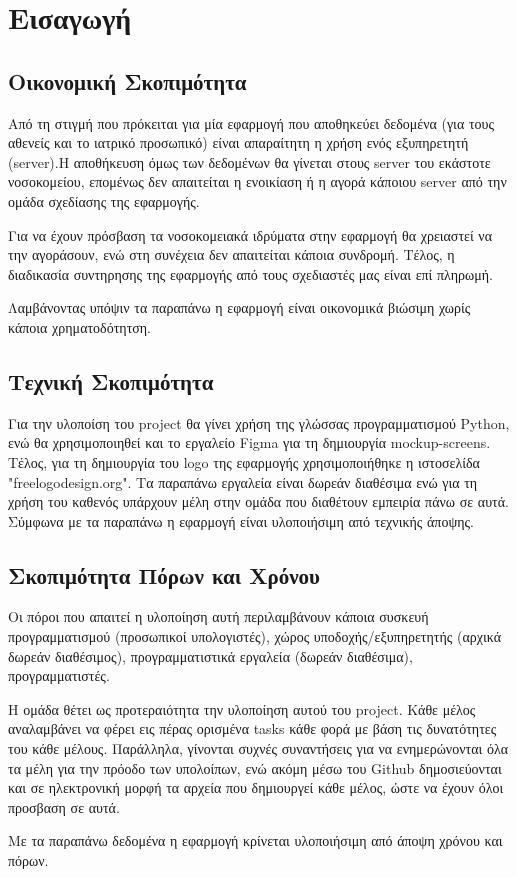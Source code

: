 \documentclass{article}
\begin{document}
{
  \hypersetup{linkcolor=black}
  \tableofcontents
}

\section{Εισαγωγή}

\subsection{Οικονομική Σκοπιμότητα}

Από τη στιγμή που πρόκειται για μία εφαρμογή που αποθηκεύει δεδομένα (για τους αθενείς και το ιατρικό προσωπικό) είναι απαραίτητη η χρήση ενός εξυπηρετητή (server).Η αποθήκευση όμως των δεδομένων θα γίνεται στους server του εκάστοτε νοσοκομείου, επομένως δεν απαιτείται η ενοικίαση ή η αγορά κάποιου server από την ομάδα σχεδίασης της εφαρμογής. \newline \par
Για να έχουν πρόσβαση τα νοσοκομειακά ιδρύματα στην εφαρμογή θα χρειαστεί να την αγοράσουν, ενώ στη συνέχεια δεν απαιτείται κάποια συνδρομή. Τέλος, η διαδικασία συντηρησης της εφαρμογής από τους σχεδιαστές μας είναι επί πληρωμή. \newline \par
Λαμβάνοντας υπόψιν τα παραπάνω η εφαρμογή είναι οικονομικά βιώσιμη χωρίς κάποια χρηματοδότητση.

\subsection{Τεχνική Σκοπιμότητα}

Για την υλοποίση του project θα γίνει χρήση της γλώσσας προγραμματισμού Python, ενώ θα χρησιμοποιηθεί και το εργαλείο Figma για τη δημιουργία mockup-screens. Τέλος, για τη δημιουργία του logo της εφαρμογής χρησιμοποιήθηκε η ιστοσελίδα "freelogodesign.org". Τα παραπάνω εργαλεία είναι δωρεάν διαθέσιμα ενώ για τη χρήση του καθενός υπάρχουν μέλη στην ομάδα που διαθέτουν εμπειρία πάνω σε αυτά. Σύμφωνα με τα παραπάνω η εφαρμογή είναι υλοποιήσιμη από τεχνικής άποψης.

\subsection{Σκοπιμότητα Πόρων και Χρόνου}

Οι πόροι που απαιτεί η υλοποίηση αυτή περιλαμβάνουν κάποια συσκευή προγραμματισμού (προσωπικοί υπολογιστές), χώρος υποδοχής/εξυπηρετητής (αρχικά δωρεάν διαθέσιμος), προγραμματιστικά εργαλεία (δωρεάν διαθέσιμα), προγραμματιστές. \newline \par
Η ομάδα θέτει ως προτεραιότητα την υλοποίηση αυτού του project. Κάθε μέλος αναλαμβάνει να φέρει εις πέρας ορισμένα tasks κάθε φορά με βάση τις δυνατότητες του κάθε μέλους. Παράλληλα, γίνονται συχνές συναντήσεις για να ενημερώνονται όλα τα μέλη για την πρόοδο των υπολοίπων, ενώ ακόμη μέσω του Github δημοσιεύονται και
σε ηλεκτρονική μορφή τα αρχεία που δημιουργεί κάθε μέλος, ώστε να έχουν όλοι προσβαση σε αυτά. \newline \par
Με τα παραπάνω δεδομένα η εφαρμογή κρίνεται υλοποιήσιμη από άποψη χρόνου και πόρων.
\end{document}
